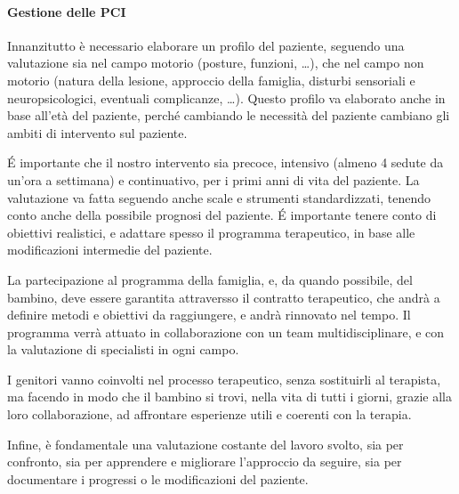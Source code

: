 \paragraph{Gestione delle PCI}
Innanzitutto è necessario elaborare un profilo del paziente, seguendo una valutazione sia nel campo motorio (posture, funzioni, \dots),
che nel campo non motorio (natura della lesione, approccio della famiglia, disturbi sensoriali e neuropsicologici, eventuali
complicanze, \dots). Questo profilo va elaborato anche in base all'età del paziente, perché cambiando le necessità del paziente cambiano
gli ambiti di intervento sul paziente.

\'E importante che il nostro intervento sia precoce, intensivo (almeno 4 sedute da un'ora a settimana) e continuativo, per i primi anni
di vita del paziente. La valutazione va fatta seguendo anche scale e strumenti standardizzati, tenendo conto anche della possibile
prognosi del paziente. \'E importante tenere conto di obiettivi realistici, e adattare spesso il programma terapeutico, in base alle
modificazioni intermedie del paziente.

La partecipazione al programma della famiglia, e, da quando possibile, del bambino, deve essere garantita attraversso il contratto
terapeutico, che andrà a definire metodi e obiettivi da raggiungere, e andrà rinnovato nel tempo. Il programma verrà attuato in
collaborazione con un team multidisciplinare, e con la valutazione di specialisti in ogni campo. 

I genitori vanno coinvolti nel processo terapeutico, senza sostituirli al terapista, ma facendo in modo che il bambino si trovi, nella
vita di tutti i giorni, grazie alla loro collaborazione, ad affrontare esperienze utili e coerenti con la terapia.

Infine, è fondamentale una valutazione costante del lavoro svolto, sia per confronto, sia per apprendere e migliorare l'approccio da
seguire, sia per documentare i progressi o le modificazioni del paziente.
